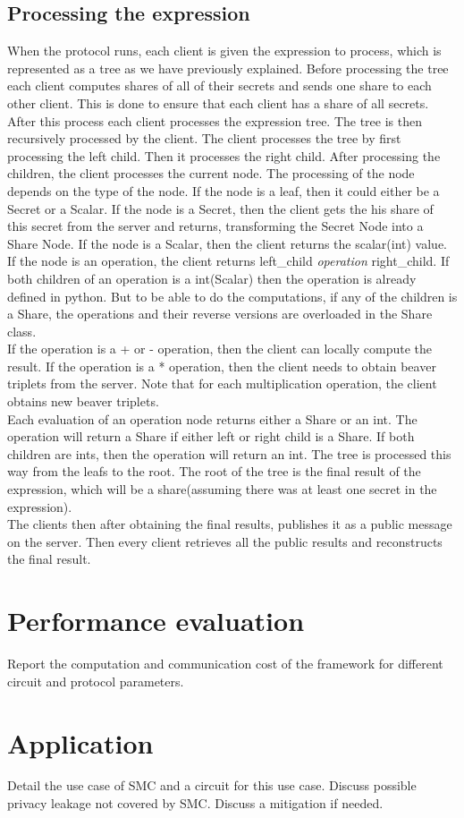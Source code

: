 \documentclass[10pt,conference,compsocconf]{IEEEtran}
\begin{document}
\subsection{Processing the expression}
\label{processing}
When the protocol runs, each client is given the expression to process, which is represented as a tree as we have previously explained. Before processing the tree
each client computes shares of all of their secrets and sends one share to each other client. This is done to ensure that each client has a share of all secrets.
After this process each client processes the expression tree. The tree is then recursively processed by the client.
The client processes the tree by first processing the left child. Then it processes the right child. After processing the children, 
the client processes the current node. The processing of the node depends on the type of the node. If the node is a leaf, then it could either be 
a Secret or a Scalar. If the node is a Secret, then the client gets the his share of this secret from the server and returns, transforming the Secret Node into a Share Node.
If the node is a Scalar, then the client returns the scalar(int) value. If the node is an operation, the client returns left\_child \textit{operation} right\_child.
If both children of an operation is a int(Scalar) then the operation is already defined in python. But to be able to do the computations, 
if any of the children is a Share, the operations and their reverse versions are overloaded in the Share class.
\\ 
If the operation is a + or - operation, then the client can locally compute the result. If the operation is a * operation, then the client needs to obtain beaver triplets from the server. 
Note that for each multiplication operation, the client obtains new beaver triplets. 
\\ 
Each evaluation of an operation node returns either a Share or an int. The operation will return a Share if either left or right child is a Share. If both children are ints, then the operation will return an int.
The tree is processed this way from the leafs to the root. The root of the tree is the final result of the expression, which will be a share(assuming there was at least one secret in the expression).
\\
The clients then after obtaining the final results, publishes it as a public message on the server. Then every client retrieves all the public results and reconstructs the final result.

\section{Performance evaluation}
\label{perf_eval}
Report the computation and communication cost of the framework for different circuit and protocol parameters.

\section{Application}
\label{use_case}
Detail the use case of SMC and a circuit for this use case. Discuss possible privacy leakage not
covered by SMC. Discuss a mitigation if needed.


\end{document}
